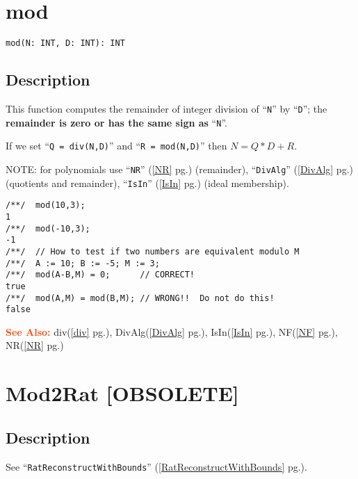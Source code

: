 \documentclass[a4paper]{mybook}
\newenvironment{command}{}{} %
\newcommand\SeeAlso{\par\textcolor{OrangeRed}{\textbf{\large See Also: }}}
\begin{document}
\section{mod}
\label{mod}
\begin{command} %


\begin{Verbatim}[label=syntax, rulecolor=\color{MidnightBlue},
frame=single]
mod(N: INT, D: INT): INT
\end{Verbatim}


\subsection*{Description}

This function computes the remainder of integer division of ``\verb&N&'' by ``\verb&D&'';
the \textbf{remainder is zero or has the same sign as} ``\verb&N&''.
\par 
If we set ``\verb&Q = div(N,D)&'' and ``\verb&R = mod(N,D)&'' then $N = Q*D + R$.
\par 
NOTE: for polynomials use ``\verb&NR&'' (\ref{NR} pg.\pageref{NR}) (remainder),  ``\verb&DivAlg&'' (\ref{DivAlg} pg.\pageref{DivAlg}) (quotients and remainder),
``\verb&IsIn&'' (\ref{IsIn} pg.\pageref{IsIn}) (ideal membership).
\begin{Verbatim}[label=example, rulecolor=\color{PineGreen}, frame=single]
/**/  mod(10,3);
1
/**/  mod(-10,3);
-1
/**/  // How to test if two numbers are equivalent modulo M
/**/  A := 10; B := -5; M := 3;
/**/  mod(A-B,M) = 0;      // CORRECT!
true
/**/  mod(A,M) = mod(B,M); // WRONG!!  Do not do this!
false
\end{Verbatim}


\SeeAlso %
  div(\ref{div} pg.\pageref{div}), 
    DivAlg(\ref{DivAlg} pg.\pageref{DivAlg}), 
    IsIn(\ref{IsIn} pg.\pageref{IsIn}), 
    NF(\ref{NF} pg.\pageref{NF}), 
    NR(\ref{NR} pg.\pageref{NR})
\end{command} %

\section{Mod2Rat [OBSOLETE]}
\label{Mod2Rat [OBSOLETE]}
\begin{command} %



\subsection*{Description}

See ``\verb&RatReconstructWithBounds&'' (\ref{RatReconstructWithBounds} pg.\pageref{RatReconstructWithBounds}).

\end{command} %
\end{document}
